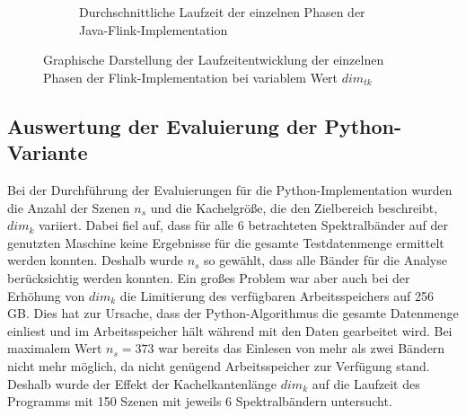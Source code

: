\begin{figure}
\begin{subfigure}[b]{0.45\textwidth}
{}
		\caption{Durchschnittliche Laufzeit der einzelnen Phasen der Java-Flink-Implementation}
  		\label{fig:diagrammJavaFlinkDimTKPhases}
	\end{subfigure}
\captionsetup{justification=centering, margin=2cm}
\caption{Graphische Darstellung der Laufzeitentwicklung der einzelnen Phasen der Flink-Implementation bei variablem Wert $dim_{tk}$}
\label{fig:diagrammsPython}
\end{figure}

\subsection{Auswertung der Evaluierung der Python-Variante}
\label{sec:resultsPython}
Bei der Durchführung der Evaluierungen für die Python-Implementation wurden die Anzahl der Szenen $n_s$ und die Kachelgröße, die den Zielbereich beschreibt, $dim_k$ variiert. Dabei fiel auf, dass für alle 6 betrachteten Spektralbänder auf der genutzten Maschine keine Ergebnisse für die gesamte Testdatenmenge ermittelt werden konnten. Deshalb wurde $n_s$ so gewählt, dass alle Bänder für die Analyse berücksichtig werden konnten. Ein großes Problem war aber auch bei der Erhöhung von $dim_k$ die Limitierung des verfügbaren Arbeitsspeichers auf 256 GB. Dies hat zur Ursache, dass der Python-Algorithmus die gesamte Datenmenge einliest und im Arbeitsspeicher hält während mit den Daten gearbeitet wird. Bei maximalem Wert $n_s = 373$ war bereits das Einlesen von mehr als zwei Bändern nicht mehr möglich, da nicht genügend Arbeitsspeicher zur Verfügung stand. Deshalb wurde der Effekt der Kachelkantenlänge $dim_k$ auf die Laufzeit des Programms mit 150 Szenen mit jeweils 6 Spektralbändern untersucht. 

